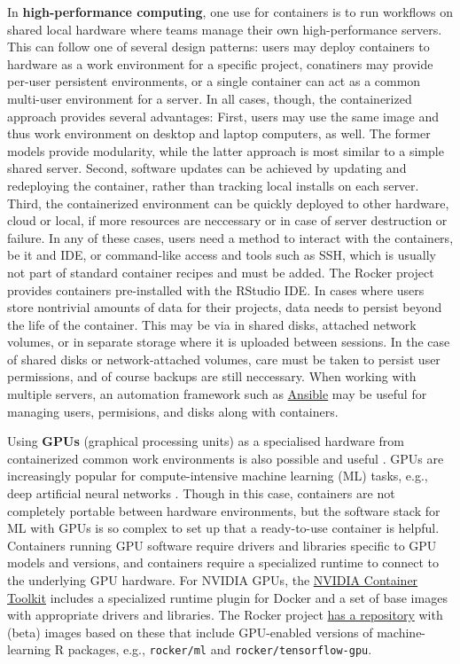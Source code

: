 In \textbf{high-performance computing}, one use for containers is to run
workflows on shared local hardware where teams manage their own
high-performance servers. This can follow one of several design
patterns: users may deploy containers to hardware as a work environment
for a specific project, conatiners may provide per-user persistent
environments, or a single container can act as a common multi-user
environment for a server. In all cases, though, the containerized
approach provides several advantages: First, users may use the same
image and thus work environment on desktop and laptop computers, as
well. The former models provide modularity, while the latter approach is
most similar to a simple shared server. Second, software updates can be
achieved by updating and redeploying the container, rather than tracking
local installs on each server. Third, the containerized environment can
be quickly deployed to other hardware, cloud or local, if more resources
are neccessary or in case of server destruction or failure. In any of
these cases, users need a method to interact with the containers, be it
and IDE, or command-like access and tools such as SSH, which is usually
not part of standard container recipes and must be added. The Rocker
project provides containers pre-installed with the RStudio IDE. In cases
where users store nontrivial amounts of data for their projects, data
needs to persist beyond the life of the container. This may be via in
shared disks, attached network volumes, or in separate storage where it
is uploaded between sessions. In the case of shared disks or
network-attached volumes, care must be taken to persist user
permissions, and of course backups are still neccessary. When working
with multiple servers, an automation framework such as
\href{https://www.ansible.com}{Ansible} may be useful for managing
users, permisions, and disks along with containers.

Using \textbf{GPUs} (graphical processing units) as a specialised
hardware from containerized common work environments is also possible
and useful \citep{haydel_enhancing_2015}. GPUs are increasingly popular
for compute-intensive machine learning (ML) tasks, e.g., deep artificial
neural networks \citep{schmidhuber_deep_2015}. Though in this case,
containers are not completely portable between hardware environments,
but the software stack for ML with GPUs is so complex to set up that a
ready-to-use container is helpful. Containers running GPU software
require drivers and libraries specific to GPU models and versions, and
containers require a specialized runtime to connect to the underlying
GPU hardware. For NVIDIA GPUs, the
\href{https://github.com/NVIDIA/nvidia-docker}{NVIDIA Container Toolkit}
includes a specialized runtime plugin for Docker and a set of base
images with appropriate drivers and libraries. The Rocker project
\href{https://github.com/rocker-org/ml}{has a repository} with (beta)
images based on these that include GPU-enabled versions of
machine-learning R packages, e.g., \texttt{rocker/ml} and
\texttt{rocker/tensorflow-gpu}.


